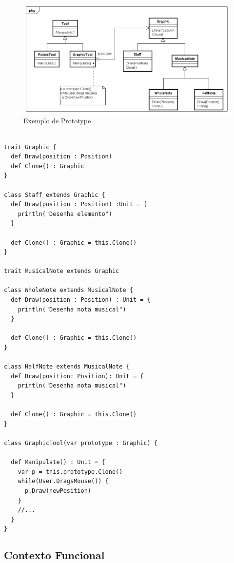 \begin{figure}[htb]
	\caption{\label{prototype_exemplo}Exemplo de Prototype}
	\begin{center}
	    \includegraphics[scale=0.5]{5_padroes-contexto-funcional/5.1_criacionais/5.1.4_prototype/prototype_exemplo.png}
	\end{center}
\end{figure}

\begin{lstlisting}[caption={Prototype Orientado a Objetos},label=ooprototype]

trait Graphic {
  def Draw(position : Position)
  def Clone() : Graphic
}

class Staff extends Graphic {
  def Draw(position : Position) :Unit = {
    println("Desenha elemento")
  }

  def Clone() : Graphic = this.Clone()
}

trait MusicalNote extends Graphic

class WholeNote extends MusicalNote {
  def Draw(position : Position) : Unit = {
    println("Desenha nota musical")
  }

  def Clone() : Graphic = this.Clone()
}

class HalfNote extends MusicalNote {
  def Draw(position: Position): Unit = {
    println("Desenha nota musical")
  }

  def Clone() : Graphic = this.Clone()
}

class GraphicTool(var prototype : Graphic) {

  def Manipulate() : Unit = {
    var p = this.prototype.Clone()
    while(User.DragsMouse()) {
      p.Draw(newPosition)
    }
    //...
  }
}

\end{lstlisting}

\subsection*{Contexto Funcional}

